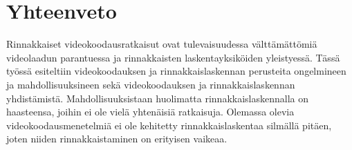\section{Yhteenveto}
\label{chap:conclusion}

Rinnakkaiset videokoodausratkaisut ovat tulevaisuudessa välttämättömiä
videolaadun parantuessa ja rinnakkaisten laskentayksiköiden yleistyessä.
Tässä työssä esiteltiin videokoodauksen ja rinnakkaislaskennan perusteita
ongelmineen ja mahdollisuuksineen sekä videokoodauksen ja rinnakkaislaskennan
yhdistämistä. Mahdollisuuksistaan huolimatta rinnakkaislaskennalla on
haasteensa, joihin ei ole vielä yhtenäisiä ratkaisuja. Olemassa olevia
videokoodausmenetelmiä ei ole kehitetty rinnakkaislaskentaa silmällä pitäen,
joten niiden rinnakkaistaminen on erityisen vaikeaa.

